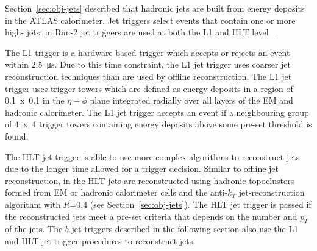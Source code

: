 Section~\ref{sec:obj-jets} described that hadronic jets are built from energy deposits in the ATLAS calorimeter.
Jet triggers select events that contain one or more high-\pT{} jets;
in Run-2 jet triggers are used at both the L1 and HLT level~\cite{trig-L1calo,trig-bTrig_desc}.


The L1 trigger is a hardware based trigger which accepts or rejects an event within \SI{2.5}{\micro\second}.
Due to this time constraint, the L1 jet trigger uses coarser jet reconstruction techniques than are used by offline reconstruction.
The L1 jet trigger uses trigger towers which are defined as energy deposits in a region of 0.1~x~0.1 in the $\eta-\phi$ plane integrated radially over all layers of the EM and hadronic calorimeter.
The L1 jet trigger accepts an event if a neighbouring group of 4~x~4 trigger towers containing energy deposits above some pre-set threshold is found.



The HLT jet trigger is able to use more complex algorithms to reconstruct jets due to the longer time allowed for a trigger decision.
Similar to offline jet reconstruction, in the HLT jets are reconstructed using 
hadronic topoclusters formed from EM or hadronic calorimeter cells and the anti-$k_T$ jet-reconstruction algorithm with $R$=0.4
(see Section~\ref{sec:obj-jets}).
The HLT jet trigger is passed if the reconstructed jets meet a pre-set criteria that depends on the number and $p_T$ of the jets.
The $b$-jet triggers described in the following section also use the L1 and HLT jet trigger procedures to reconstruct jets.


